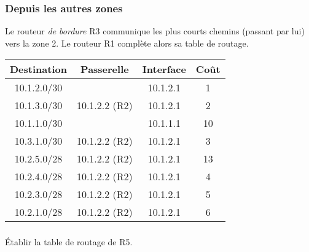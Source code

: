 \documentclass[svgnames,11pt]{beamer}
\begin{document}
\begin{frame}
    \frametitle{Depuis les autres zones}
    Le routeur \emph{de bordure} R3 communique les plus courts chemins (passant par lui) vers la zone 2. Le routeur R1 complète alors sa table de routage.
    \begin{center}
        \begin{tabular}{|*{4}{c|}}
            \hline
            Destination & Passerelle & Interface & Coût \\
            \hline
            10.1.2.0/30 &  & 10.1.2.1 & 1 \\
            \hline
            10.1.3.0/30 & 10.1.2.2 (R2) & 10.1.2.1 & 2 \\
            \hline
            10.1.1.0/30 &  & 10.1.1.1 & 10 \\
            \hline
            10.3.1.0/30 & 10.1.2.2 (R2) & 10.1.2.1 & 3 \\
            \hline
            10.2.5.0/28 & 10.1.2.2 (R2) & 10.1.2.1 & 13 \\
            \hline
            10.2.4.0/28 & 10.1.2.2 (R2) & 10.1.2.1 & 4 \\
            \hline
            10.2.3.0/28 & 10.1.2.2 (R2) & 10.1.2.1 & 5 \\
            \hline
            10.2.1.0/28 & 10.1.2.2 (R2) & 10.1.2.1 & 6 \\
            \hline
        \end{tabular}
    \end{center}
    

\end{frame}

\begin{frame}
    \frametitle{}
    \begin{activite}
        Établir la table de routage de R5.
        \end{activite}
    

\end{frame}

\begin{frame}
    \frametitle{}

    \begin{center}
        \label{zone2}
    \end{center}

\end{frame}
\end{document}
